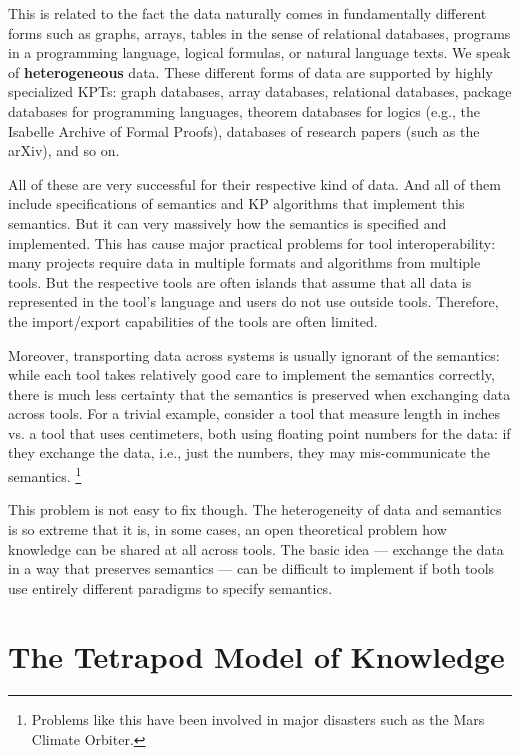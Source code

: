 This is related to the fact the data naturally comes in fundamentally different forms such as graphs, arrays, tables in the sense of relational databases, programs in a programming language, logical formulas, or natural language texts.
We speak of \textbf{heterogeneous} data.
These different forms of data are supported by highly specialized KPTs: graph databases, array databases, relational databases, package databases for programming languages, theorem databases for logics (e.g., the Isabelle Archive of Formal Proofs), databases of research papers (such as the arXiv), and so on.

All of these are very successful for their respective kind of data.
And all of them include specifications of semantics and KP algorithms that implement this semantics.
But it can very massively how the semantics is specified and implemented.
This has cause major practical problems for tool interoperability: many projects require data in multiple formats and algorithms from multiple tools.
But the respective tools are often islands that assume that all data is represented in the tool's language and users do not use outside tools.
Therefore, the import/export capabilities of the tools are often limited.

Moreover, transporting data across systems is usually ignorant of the semantics: while each tool takes relatively good care to implement the semantics correctly, there is much less certainty that the semantics is preserved when exchanging data across tools.
For a trivial example, consider a tool that measure length in inches vs. a tool that uses centimeters, both using floating point numbers for the data: if they exchange the data, i.e., just the numbers, they may mis-communicate the semantics.%
\footnote{Problems like this have been involved in major disasters such as the Mars Climate Orbiter.} 

This problem is not easy to fix though.
The heterogeneity of data and semantics is so extreme that it is, in some cases, an open theoretical problem how knowledge can be shared at all across tools.
The basic idea --- exchange the data in a way that preserves semantics --- can be difficult to implement if both tools use entirely different paradigms to specify semantics.

\section{The Tetrapod Model of Knowledge}

